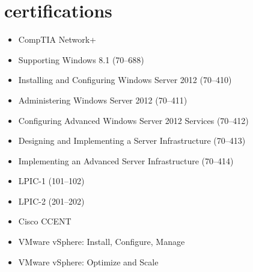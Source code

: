 \documentclass[]{friggeri-cv} %
\begin{document}
\section{certifications}
\begin{itemize}
  \item CompTIA Network+
  \item Supporting Windows 8.1 (70--688)
  \item Installing and Configuring Windows Server 2012 (70--410)
  \item Administering Windows Server 2012 (70--411)
  \item Configuring Advanced Windows Server 2012 Services (70--412)
  \item Designing and Implementing a Server Infrastructure (70--413)
  \item Implementing an Advanced Server Infrastructure (70--414)
  \item LPIC-1 (101--102)
  \item LPIC-2 (201--202)
  \item Cisco CCENT
  \item VMware vSphere: Install, Configure, Manage
  \item VMware vSphere: Optimize and Scale
\end{itemize}
\end{document}
